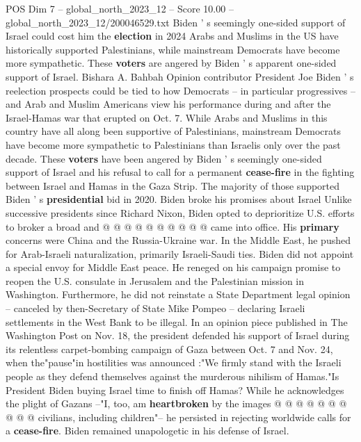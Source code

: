 \begin{textsample}{POS Dim 7 – global\_north\_2023\_12 – Score 10.00 – global\_north\_2023\_12/200046529.txt}  \label{ex:f7_pos_150}
Biden ' s seemingly one-sided support of Israel could cost him the \textbf{election} in 2024 Arabs and Muslims in the US have historically supported Palestinians, while mainstream Democrats have become more sympathetic.
These \textbf{voters} are angered by Biden ' s apparent one-sided support of Israel.
Bishara A.
Bahbah Opinion contributor President Joe Biden ' s reelection prospects could be tied to how Democrats -- in particular progressives -- and Arab and Muslim Americans view his performance during and after the Israel-Hamas war that erupted on Oct. 7.
While Arabs and Muslims in this country have all along been supportive of Palestinians, mainstream Democrats have become more sympathetic to Palestinians than Israelis only over the past decade.
These \textbf{voters} have been angered by Biden ' s seemingly one-sided support of Israel and his refusal to call for a permanent \textbf{cease-fire} in the fighting between Israel and Hamas in the Gaza Strip.
The majority of those supported Biden ' s \textbf{presidential} bid in 2020.
Biden broke his promises about Israel Unlike successive presidents since Richard Nixon, Biden opted to deprioritize U.S. efforts to broker a broad and @ @ @ @ @ @ @ @ @ @ came into office.
His \textbf{primary} concerns were China and the Russia-Ukraine war.
In the Middle East, he pushed for Arab-Israeli naturalization, primarily Israeli-Saudi ties.
Biden did not appoint a special envoy for Middle East peace.
He reneged on his campaign promise to reopen the U.S. consulate in Jerusalem and the Palestinian mission in Washington.
Furthermore, he did not reinstate a State Department legal opinion -- canceled by then-Secretary of State Mike Pompeo -- declaring Israeli settlements in the West Bank to be illegal.
In an opinion piece published in The Washington Post on Nov. 18, the president defended his support of Israel during its relentless carpet-bombing campaign of Gaza between Oct. 7 and Nov. 24, when the"pause"in hostilities was announced :"We firmly stand with the Israeli people as they defend themselves against the murderous nihilism of Hamas."Is President Biden buying Israel time to finish off Hamas?
While he acknowledges the plight of Gazans --"I, too, am \textbf{heartbroken} by the images @ @ @ @ @ @ @ @ @ @ civilians, including children"-- he persisted in rejecting worldwide calls for a \textbf{cease-fire}.
Biden remained unapologetic in his defense of Israel.

\end{textsample}
